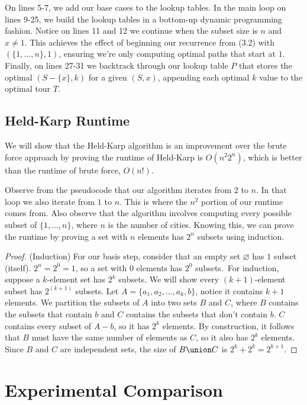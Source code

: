 \documentclass[11pt,fleqn]{article}
\begin{document}
On lines 5-7, we add our base cases to the lookup tables.  In the main loop on
lines 9-25, we build the lookup tables in a bottom-up dynamic programming fashion.
Notice on lines 11 and 12 we continue when the subset size is $n$ and $x \neq 1$.
This achieves the effect of beginning our recurrence from (3.2) with $(\{1,\dots,n\}, 1)$,
ensuring we're only computing optimal paths that start at $1$.  Finally, on lines 27-31
we backtrack through our lookup table $P$ that stores the optimal $(S-\{x\}, k)$
for a given $(S, x)$, appending each optimal $k$ value to the optimal tour $T$.

\subsection{Held-Karp Runtime}
We will show that the Held-Karp algorithm is an improvement over the brute force
approach by proving the runtime of Held-Karp is $O(n^{2}2^n)$, which is better than
the runtime of brute force, $O(n!)$.

Observe from the pseudocode that our algorithm iterates from $2$ to $n$.  In that
loop we also iterate from $1$ to $n$.  This is where the $n^2$ portion of our runtime
comes from.  Also observe that the algorithm involves computing every possible subset
of $\{1,\dots,n\}$, where $n$ is the number of cities.  Knowing this, we can prove the
runtime by proving a set with $n$ elements has $2^n$ subsets using induction.

\begin{proof}
  (Induction) For our basis step, consider that an empty set $\varnothing$ has $1$
  subset (itself).  $2^n = 2^0 = 1$, so a set with $0$ elements has $2^0$ subsets.\
  For induction, suppose a $k$-element set has $2^k$ subsets.  We will show every
  $(k+1)$-element subset has $2^(k+1)$ subsets.  Let $A=\{a_1,a_2,\dots,a_k, b\}$,
  notice it contains $k+1$ elements.  We partition the subsets of $A$ into two sets
  $B$ and $C$, where $B$ contains the subsets that contain $b$ and $C$ contains
  the subsets that don't contain $b$.  $C$ contains every subset of $A-{b}$, so it
  has $2^k$ elements.  By construction, it follows that $B$ must have the same number
  of elements as $C$, so it also has $2^k$ elements.  Since $B$ and $C$ are independent
  sets, the size of $B\union C$ is $2^k + 2^k = 2^{k+1}$.
\end{proof}

\section{Experimental Comparison}
\end{document}
